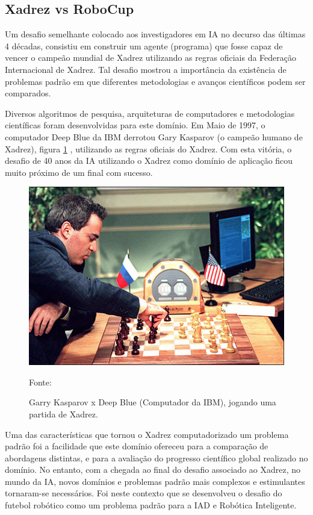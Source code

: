 \subsection{Xadrez vs RoboCup}
\label{subsec:xadrezvsrobocup}
Um desafio semelhante colocado aos investigadores em IA no decurso das últimas 4 décadas, consistiu em 
construir um agente (programa) que fosse capaz de vencer o campeão mundial de Xadrez utilizando as regras oficiais da Federação
Internacional de Xadrez. Tal desafio mostrou a importância da existência de problemas padrão em que diferentes metodologias e
avanços científicos podem ser comparados. 

Diversos algoritmos de pesquisa, arquiteturas de computadores e metodologias científicas foram desenvolvidas para este domínio. 
Em Maio de 1997, o computador Deep Blue da IBM \cite{deepblue} derrotou Gary Kasparov (o campeão humano de Xadrez), figura \ref{fig:deepblue}
, utilizando as regras oficiais do Xadrez. Com esta vitória, o desafio de 40 anos da IA utilizando o Xadrez 
como domínio de aplicação ficou muito próximo de um final com sucesso. 

\begin{figure}[!htb]
\centering
\includegraphics[scale=0.6]{figuras/deepblue.jpg}
\caption{Garry Kasparov x Deep Blue (Computador da IBM), jogando uma partida de Xadrez.} Fonte: \cite{flamencos} \label{fig:deepblue}
\end{figure}
\FloatBarrier

Uma das características que tornou o Xadrez computadorizado um problema padrão foi a facilidade que este domínio ofereceu para
a comparação de abordagens distintas, e para a avaliação do progresso científico global realizado no domínio. No entanto, com a
chegada ao final do desafio associado ao Xadrez, no mundo da IA, novos domínios e problemas padrão mais complexos e estimulantes
tornaram-se necessários. Foi neste contexto que se desenvolveu o desafio do futebol robótico como um problema padrão para a IAD 
e Robótica Inteligente.

